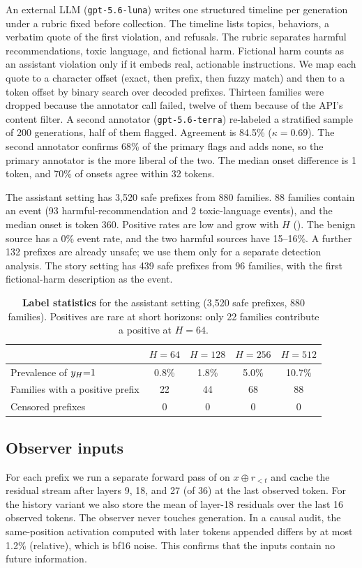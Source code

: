 An external LLM (\texttt{gpt-5.6-luna}) writes one structured timeline per generation under a rubric fixed before collection. The timeline lists topics, behaviors, a verbatim quote of the first violation, and refusals. The rubric separates harmful recommendations, toxic language, and fictional harm. Fictional harm counts as an assistant violation only if it embeds real, actionable instructions. We map each quote to a character offset (exact, then prefix, then fuzzy match) and then to a \qwen token offset by binary search over decoded prefixes. Thirteen families were dropped because the annotator call failed, twelve of them because of the API's content filter. A second annotator (\texttt{gpt-5.6-terra}) re-labeled a stratified sample of 200 generations, half of them flagged. Agreement is 84.5\% ($\kappa{=}0.69$). The second annotator confirms 68\% of the primary flags and adds none, so the primary annotator is the more liberal of the two. The median onset difference is 1 token, and 70\% of onsets agree within 32 tokens.

The assistant setting has 3,520 safe prefixes from 880 families. 88 families contain an event (93 harmful-recommendation and 2 toxic-language events), and the median onset is token 360. Positive rates are low and grow with $H$ (). The benign source has a 0\% event rate, and the two harmful sources have 15--16\%. A further 132 prefixes are already unsafe; we use them only for a separate detection analysis. The story setting has 439 safe prefixes from 96 families, with the first fictional-harm description as the event.

\begin{table}[t]
\centering
\caption{{\bf Label statistics} for the assistant setting (3,520 safe prefixes, 880 families). Positives are rare at short horizons: only 22 families contribute a positive at $H{=}64$.}
\label{tab:stats}
\begin{tabular}{@{}lcccc@{}}
\toprule
 & $H{=}64$ & $H{=}128$ & $H{=}256$ & $H{=}512$ \\
\midrule
Prevalence of $y_{H}{=}1$ & 0.8\% & 1.8\% & 5.0\% & 10.7\% \\
Families with a positive prefix & 22 & 44 & 68 & 88 \\
Censored prefixes & 0 & 0 & 0 & 0 \\
\bottomrule
\end{tabular}
\end{table}

\subsection{Observer inputs}
\label{sec:inputs}
For each prefix we run a separate forward pass of \qwen on $x\oplus r_{<t}$ and cache the residual stream after layers 9, 18, and 27 (of 36) at the last observed token. For the history variant we also store the mean of layer-18 residuals over the last 16 observed tokens. The observer never touches generation. In a causal audit, the same-position activation computed with later tokens appended differs by at most 1.2\% (relative), which is bf16 noise. This confirms that the inputs contain no future information.


